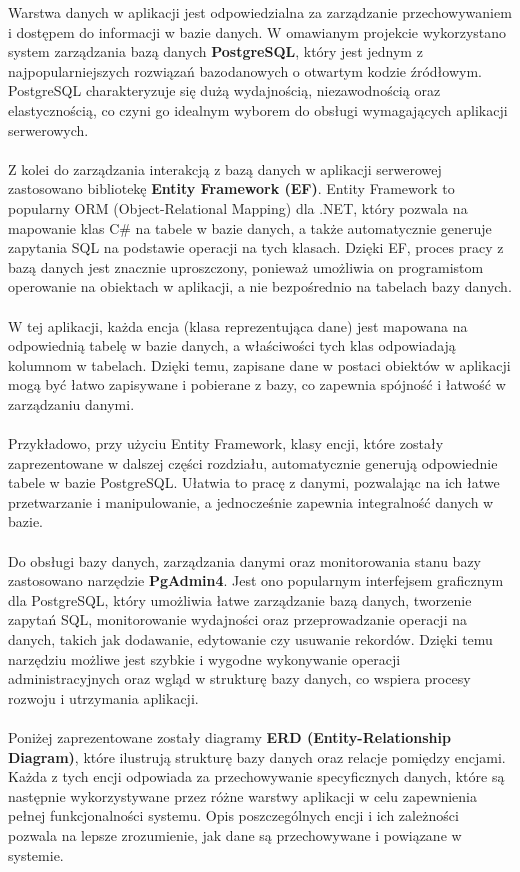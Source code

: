 \documentclass[12pt,a4paper]{article}
\begin{document}
Warstwa danych w aplikacji jest odpowiedzialna za zarządzanie przechowywaniem i dostępem do informacji w bazie danych. W omawianym projekcie wykorzystano system zarządzania bazą danych \textbf{PostgreSQL}, który jest jednym z najpopularniejszych rozwiązań bazodanowych o otwartym kodzie źródłowym. PostgreSQL charakteryzuje się dużą wydajnością, niezawodnością oraz elastycznością, co czyni go idealnym wyborem do obsługi wymagających aplikacji serwerowych.
\\\\
Z kolei do zarządzania interakcją z bazą danych w aplikacji serwerowej zastosowano bibliotekę \textbf{Entity Framework (EF)}. Entity Framework to popularny ORM (Object-Relational Mapping) dla .NET, który pozwala na mapowanie klas C\# na tabele w bazie danych, a także automatycznie generuje zapytania SQL na podstawie operacji na tych klasach. Dzięki EF, proces pracy z bazą danych jest znacznie uproszczony, ponieważ umożliwia on programistom operowanie na obiektach w aplikacji, a nie bezpośrednio na tabelach bazy danych.
\\\\
W tej aplikacji, każda encja (klasa reprezentująca dane) jest mapowana na odpowiednią tabelę w bazie danych, a właściwości tych klas odpowiadają kolumnom w tabelach. Dzięki temu, zapisane dane w postaci obiektów w aplikacji mogą być łatwo zapisywane i pobierane z bazy, co zapewnia spójność i łatwość w zarządzaniu danymi.
\\\\
Przykładowo, przy użyciu Entity Framework, klasy encji, które zostały zaprezentowane w dalszej części rozdziału, automatycznie generują odpowiednie tabele w bazie PostgreSQL. Ułatwia to pracę z danymi, pozwalając na ich łatwe przetwarzanie i manipulowanie, a jednocześnie zapewnia integralność danych w bazie.
\\\\
Do obsługi bazy danych, zarządzania danymi oraz monitorowania stanu bazy zastosowano narzędzie \textbf{PgAdmin4}. Jest ono popularnym interfejsem graficznym dla PostgreSQL, który umożliwia łatwe zarządzanie bazą danych, tworzenie zapytań SQL, monitorowanie wydajności oraz przeprowadzanie operacji na danych, takich jak dodawanie, edytowanie czy usuwanie rekordów. Dzięki temu narzędziu możliwe jest szybkie i wygodne wykonywanie operacji administracyjnych oraz wgląd w strukturę bazy danych, co wspiera procesy rozwoju i utrzymania aplikacji.
\\\\
Poniżej zaprezentowane zostały diagramy \textbf{ERD (Entity-Relationship Diagram)}, które ilustrują strukturę bazy danych oraz relacje pomiędzy encjami. Każda z tych encji odpowiada za przechowywanie specyficznych danych, które są następnie wykorzystywane przez różne warstwy aplikacji w celu zapewnienia pełnej funkcjonalności systemu. Opis poszczególnych encji i ich zależności pozwala na lepsze zrozumienie, jak dane są przechowywane i powiązane w systemie.
\end{document}
